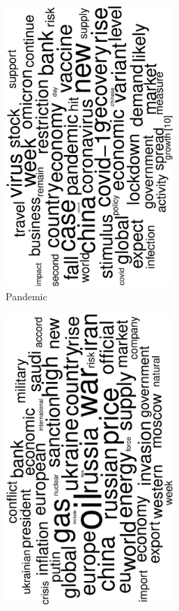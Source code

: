 \begin{figure}
\begin{subfigure}{0.32\textwidth}
		\includegraphics[width=0.7\textwidth,angle=270]{figures/wordcloud3.eps}
		\caption{Pandemic}
	\end{subfigure}
	\begin{subfigure}{0.32\textwidth}
		\includegraphics[width=0.7\textwidth,angle=270]{figures/wordcloud2.eps}

\end{subfigure}
\end{figure}

